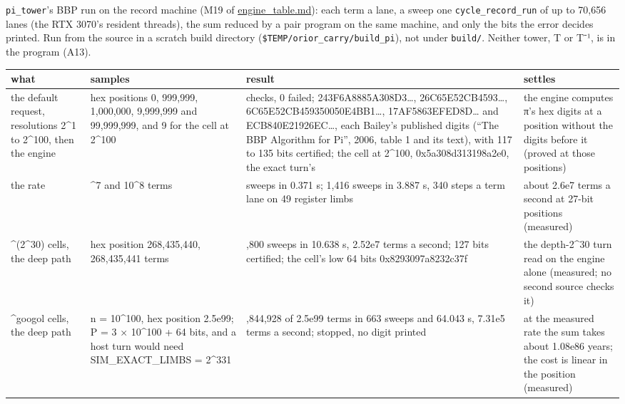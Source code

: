 \texttt{pi\_\allowbreak{}tower}'s BBP run on the record machine (M19 of \hyperref[chap:engine-table]{engine\_\allowbreak{}table.md}): each term a lane, a sweep one \texttt{cycle\_\allowbreak{}record\_\allowbreak{}run} of up to 70,656 lanes (the RTX 3070's resident threads), the sum reduced by a pair program on the same machine, and only the bits the error decides printed. Run from the source in a scratch build directory (\texttt{\$TEMP/\allowbreak{}orior\_\allowbreak{}carry/\allowbreak{}build\_\allowbreak{}pi}), not under \texttt{build/\allowbreak{}}. Neither tower, T or T⁻¹, is in the program (A13).

{\footnotesize
\setlength{\tabcolsep}{6pt}
\begin{longtable}{>{\RaggedRight\arraybackslash}p{}>{\RaggedRight\arraybackslash}p{}>{\RaggedRight\arraybackslash}p{}>{\RaggedRight\arraybackslash}p{}}
\toprule
what & samples & result & settles \\
\midrule
\endhead
the default request, resolutions 2\textasciicircum{}1 to 2\textasciicircum{}100, then the engine & hex positions 0, 999,999, 1,000,000, 9,999,999 and 99,999,999, and 9 for the cell at 2\textasciicircum{}100 & 41 checks, 0 failed; 243F6A8885A308D3…, 26C65E52CB4593…, 6C65E52CB459350050E4BB1…, 17AF5863EFED8D… and ECB840E21926EC…, each Bailey's published digits (“The BBP Algorithm for Pi”, 2006, table 1 and its text), with 117 to 135 bits certified; the cell at 2\textasciicircum{}100, 0x5a308d313198a2e0, the exact turn's & the engine computes π's hex digits at a position without the digits before it (proved at those positions) \\
the rate & 10\textasciicircum{}7 and 10\textasciicircum{}8 terms & 142 sweeps in 0.371 s; 1,416 sweeps in 3.887 s, 340 steps a term lane on 49 register limbs & about 2.6e7 terms a second at 27-bit positions (measured) \\
2\textasciicircum{}(2\textasciicircum{}30) cells, the deep path & hex position 268,435,440, 268,435,441 terms & 3,800 sweeps in 10.638 s, 2.52e7 terms a second; 127 bits certified; the cell's low 64 bits 0x8293097a8232c37f & the depth-2\textasciicircum{}30 turn read on the engine alone (measured; no second source checks it) \\
2\textasciicircum{}googol cells, the deep path & n = 10\textasciicircum{}100, hex position 2.5e99; P = 3 × 10\textasciicircum{}100 + 64 bits, and a host turn would need SIM\_\allowbreak{}EXACT\_\allowbreak{}LIMBS = 2\textasciicircum{}331 & 46,844,928 of 2.5e99 terms in 663 sweeps and 64.043 s, 7.31e5 terms a second; stopped, no digit printed & at the measured rate the sum takes about 1.08e86 years; the cost is linear in the position (measured) \\

\end{longtable}}
